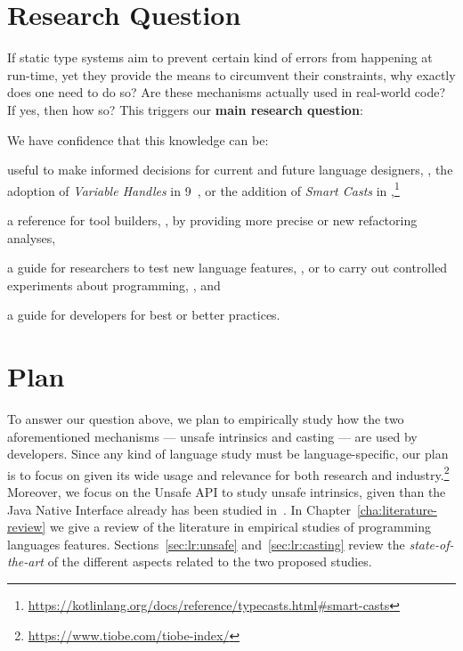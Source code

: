 \section{Research Question}

If static type systems aim to prevent certain kind of errors from happening at run-time,
yet they provide the means to circumvent their constraints,
why exactly does one need to do so?
Are these mechanisms actually used in real-world code?
If yes, then how so?
This triggers our \textbf{main research question}:


We have confidence that this knowledge can be:
\begin{inparaenum}[a)]
\item useful to make informed decisions for current and future language designers,
\eg{}, the adoption of \emph{Variable Handles} in \java{} 9~\citep{jep193},
or the addition of \emph{Smart Casts} in ,\footnote{\url{https://kotlinlang.org/docs/reference/typecasts.html\#smart-casts}}
\item a reference for tool builders, \eg{}, by providing more precise or new refactoring analyses,
\item a guide for researchers to test new language features, \eg{}, \cite{wintherGuardedTypePromotion2011} or to carry out controlled experiments about programming, \eg{}, \cite{stuchlikStaticVsDynamic2011} and
\item a guide for developers for best or better practices.
\end{inparaenum}

\section{Plan}

To answer our question above,
we plan to empirically study how the two aforementioned mechanisms
--- unsafe intrinsics and casting ---
are used by developers.
Since any kind of language study must be language-specific,
our plan is to focus on \java{} given its wide usage and relevance for both
research and industry.\footnote{\url{https://www.tiobe.com/tiobe-index/}}
Moreover, we focus on the \java{} Unsafe API to study unsafe intrinsics,
given than the Java Native Interface already has been studied in~\cite{tanSafeJavaNative2006,tanEmpiricalSecurityStudy2008,kondohFindingBugsJava2008,sunNativeGuardProtectingAndroid2014,liFindingBugsExceptional2009}.
In Chapter~\ref{cha:literature-review} we give a review of the literature in empirical studies of programming languages features.
Sections~\ref{sec:lr:unsafe} and~\ref{sec:lr:casting} review the \emph{state-of-the-art} of the different aspects related to the two proposed studies.

